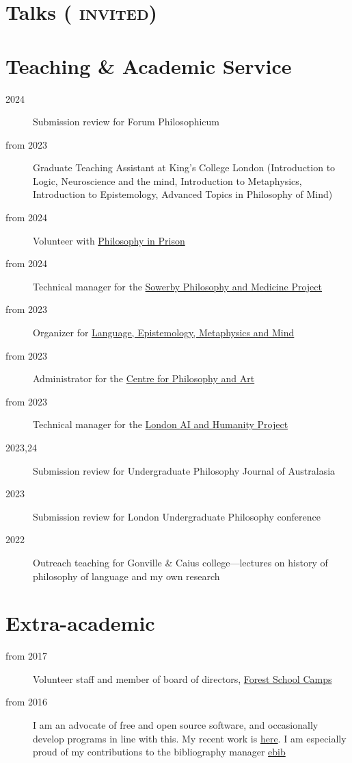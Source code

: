 \documentclass{cv}
\begin{document}
\section*{Talks \textsc{\textnormal{\normalsize{(\invited{} invited)}}}}
\printbibliography[check=Presentation]{}

\section*{Teaching \& Academic Service}
\begin{description}
\item[{2024}] Submission review for Forum Philosophicum
\item[{from 2023}] Graduate Teaching Assistant at King's College London
(Introduction to Logic, Neuroscience and the mind, Introduction to
Metaphysics, Introduction to Epistemology, Advanced Topics in
Philosophy of Mind)
\item[{from 2024}] Volunteer with \href{https://www.philosophyinprison.com/}{Philosophy in Prison}
\item[{from 2024}] Technical manager for the \href{https://www.philosophyandmedicine.org/}{Sowerby Philosophy and
Medicine Project}
\item[{from 2023}] Organizer for \href{https://www.lemm-london.co.uk/}{Language, Epistemology, Metaphysics and Mind}
\item[{from 2023}] Administrator for the \href{https://philosophyarts.co.uk/}{Centre for Philosophy and Art}
\item[{from 2023}] Technical manager for the \href{https://www.ai-humanity-london.com/}{London AI and Humanity Project}
\item[{2023,24}] Submission review for Undergraduate Philosophy Journal of
Australasia
\item[{2023}] Submission review for London Undergraduate Philosophy
conference
\item[{2022}] Outreach teaching for Gonville \& Caius college---lectures on
history of philosophy of language and my own research
\end{description}

\section*{Extra-academic}
\begin{description}
\item[{from 2017}] Volunteer staff and member of board of directors,
\href{https://www.fsc.org.uk/}{Forest School Camps}
\item[{from 2016}] I am an advocate of free and open source software, and
occasionally develop programs in line with this. My recent work is
\href{https://github.com/Hugo-Heagren}{here}. I am especially proud of my contributions to the bibliography
manager \href{https://joostkremers.github.io/ebib/}{ebib}
\end{description}
\end{document}
